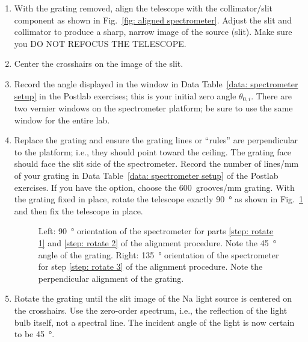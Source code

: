 \documentclass[addpoints]{physlabs}
\begin{document}
\begin{labsection}
\begin{experiment}
\begin{enumerate}
    \item \label{step: align 1} With the grating removed, align the telescope with the collimator/slit component as shown in Fig.~\ref{fig: aligned spectrometer}. Adjust the slit and collimator to produce a sharp, narrow image of the source (slit). Make sure you DO NOT REFOCUS THE TELESCOPE.
    \item \label{step: align 2} Center the crosshairs on the image of the slit.
    \item \label{step: align 3} Record the angle displayed in the window in Data Table~\ref{data: spectrometer setup} in the Postlab exercises; this is your initial zero angle $\theta_{0,i}$. There are two vernier windows on the spectrometer platform; be sure to use the same window for the entire lab.
    \item \label{step: rotate 1} Replace the grating and ensure the grating lines or ``rules'' are perpendicular to the platform; i.e., they should point toward the ceiling. The grating face should face the slit side of the spectrometer. Record the number of lines/mm of your grating in Data Table~\ref{data: spectrometer setup} of the Postlab exercises. If you have the option, choose the 600~grooves/mm grating. With the grating fixed in place, rotate the telescope exactly \qty{90}{\degree} as shown in Fig.~\ref{fig: spectrometer rotated} and then fix the telescope in place.

    \begin{figure}[ht]
        \centering
        \scalebox{0.5}{}
        \hfill
        \scalebox{0.5}{}
        \caption{Left: \qty{90}{\degree} orientation of the spectrometer for parts \ref{step: rotate 1} and \ref{step: rotate 2} of the alignment procedure. Note the \qty{45}{\degree} angle of the grating. Right: \qty{135}{\degree} orientation of the spectrometer for step \ref{step: rotate 3} of the alignment procedure. Note the perpendicular alignment of the grating.}
        \label{fig: spectrometer rotated}
    \end{figure}

    \item \label{step: rotate 2} Rotate the grating until the slit image of the Na light source is centered on the crosshairs. Use the zero-order spectrum, i.e., the reflection of the light bulb itself, not a spectral line. The incident angle of the light is now certain to be \qty{45}{\degree}.


\end{enumerate}
\end{experiment}
\end{labsection}
\end{document}
